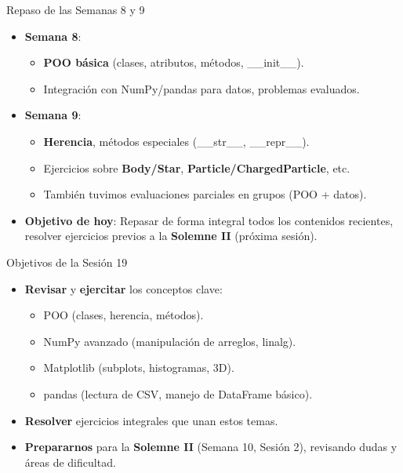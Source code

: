\documentclass[10pt]{beamer}
\begin{document}
\begin{frame}{Repaso de las Semanas 8 y 9}
  \begin{itemize}
    \item \textbf{Semana 8}:
      \begin{itemize}
        \item \textbf{POO básica} (clases, atributos, métodos, \_\_init\_\_).
        \item Integración con NumPy/pandas para datos, problemas evaluados.
      \end{itemize}
    \item \textbf{Semana 9}:
      \begin{itemize}
        \item \textbf{Herencia}, métodos especiales (\_\_str\_\_, \_\_repr\_\_).
        \item Ejercicios sobre \textbf{Body/Star}, \textbf{Particle/ChargedParticle}, etc.
        \item También tuvimos evaluaciones parciales en grupos (POO + datos).
      \end{itemize}
    \item \textbf{Objetivo de hoy}: Repasar de forma integral todos los contenidos recientes, resolver ejercicios previos a la \textbf{Solemne II} (próxima sesión).
  \end{itemize}
\end{frame}

\begin{frame}{Objetivos de la Sesión 19}
  \begin{itemize}
    \item \textbf{Revisar} y \textbf{ejercitar} los conceptos clave:
      \begin{itemize}
        \item POO (clases, herencia, métodos).
        \item NumPy avanzado (manipulación de arreglos, linalg).
        \item Matplotlib (subplots, histogramas, 3D).
        \item pandas (lectura de CSV, manejo de DataFrame básico).
      \end{itemize}
    \item \textbf{Resolver} ejercicios integrales que unan estos temas.
    \item \textbf{Prepararnos} para la \textbf{Solemne II} (Semana 10, Sesión 2), revisando dudas y áreas de dificultad.
  \end{itemize}
\end{frame}
\end{document}
